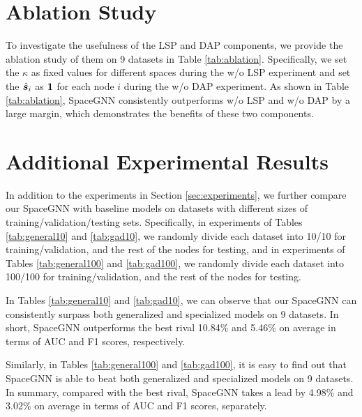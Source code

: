\section{Ablation Study}
\label{subsec:ablation}

To investigate the usefulness of the LSP and DAP components, we provide the ablation study of them on 9 datasets in Table \ref{tab:ablation}. Specifically, we set the $\kappa$ as fixed values for different spaces during the w/o LSP experiment and set the $\hat{\boldsymbol{s}}_i$ as $\boldsymbol{1}$ for each node $i$ during the w/o DAP experiment. As shown in Table \ref{tab:ablation}, SpaceGNN consistently outperforms w/o LSP and w/o DAP by a large margin, which demonstrates the benefits of these two components. 

\section{Additional Experimental Results}
\label{subsec:Additional}


In addition to the experiments in Section \ref{sec:experiments}, we further compare our SpaceGNN with baseline models on datasets with different sizes of training/validation/testing sets. Specifically, in experiments of Tables \ref{tab:general10} and \ref{tab:gad10}, we randomly divide each dataset into 10/10 for training/validation, and the rest of the nodes for testing, and in experiments of Tables \ref{tab:general100} and \ref{tab:gad100}, we randomly divide each dataset into 100/100 for training/validation, and the rest of the nodes for testing. 




In Tables \ref{tab:general10} and \ref{tab:gad10}, we can observe that our SpaceGNN can consistently surpass both generalized and specialized models on 9 datasets. In short, SpaceGNN outperforms the best rival 10.84\% and 5.46\% on average in terms of AUC and F1 scores, respectively. 

Similarly, in Tables \ref{tab:general100} and \ref{tab:gad100}, it is easy to find out that SpaceGNN is able to beat both generalized and specialized models on 9 datasets. In summary, compared with the best rival, SpaceGNN takes a lead by 4.98\% and 3.02\% on average in terms of AUC and F1 scores, separately. 

